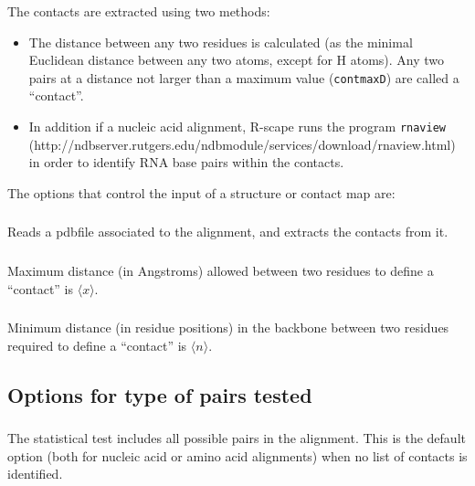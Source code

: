 \noindent
The contacts are extracted using two methods:
\begin{itemize}

\item The distance between any two residues is calculated (as the  minimal Euclidean distance between any two atoms, except
for H atoms). Any two pairs at a distance not larger than a maximum
value (\texttt{contmaxD}) are called a ``contact''.

\item In addition if a nucleic acid alignment, R-scape runs the program \texttt{rnaview}~\citep{YangWesthof03}\\
(http://ndbserver.rutgers.edu/ndbmodule/services/download/rnaview.html)
in order to identify RNA base pairs within the contacts.
\end{itemize}

\vspace{2mm}
\noindent
The options that control the input of a structure or contact map are:

\subsubsection{} Reads a pdbfile associated to the alignment, and extracts the contacts
from it.

\subsubsection{} Maximum distance (in Angstroms) allowed between two residues to define a ``contact'' is $\langle x\rangle$.

\subsubsection{} Minimum distance (in residue positions) in the backbone between two residues required to define a ``contact'' is $\langle n\rangle$.

\subsection{Options for type of pairs tested}

\subsubsection{}
The statistical test includes all possible pairs in the alignment.
This is the default option (both for nucleic acid or amino acid
alignments) when no list of contacts is identified. 


